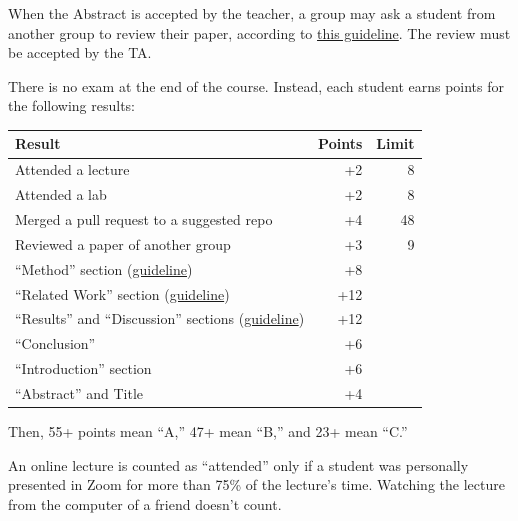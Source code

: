 \documentclass[nobrand,anonymous,nodate,nosecurity]{huawei}
\begin{document}
{When the Abstract is accepted by the teacher, a group may ask a student from another
group to review their paper, according to
\href{https://www.yegor256.com/2023/12/17/how-to-review-research-paper.html}{this guideline}.
The review must be accepted by the TA.

There is no exam at the end of the course. Instead,
each student earns points for the following results:\\
\renewcommand{\arraystretch}{1}
\begin{tabular}{lrr}
Result & Points & Limit \\
\hline
Attended a lecture & +2 & 8 \\
Attended a lab & +2 & 8 \\
Merged a pull request to a suggested repo & +4 & 48 \\
Reviewed a paper of another group & +3 & 9 \\
``Method'' section (\href{https://www.yegor256.com/2023/10/11/method-of-research.html}{guideline}) & +8 \\
``Related Work'' section (\href{https://www.yegor256.com/2023/09/29/how-to-write-related-work-section.html}{guideline}) & +12 \\
``Results'' and ``Discussion'' sections (\href{https://www.yegor256.com/2023/12/11/results-and-discussion.html}{guideline}) & +12 \\
``Conclusion'' & +6 \\
``Introduction'' section & +6 \\
``Abstract'' and Title & +4 \\
\end{tabular}

Then, 55+ points mean ``A,'' 47+ mean ``B,'' and 23+ mean ``C.''

An online lecture is counted as ``attended'' only if a student was personally
presented in Zoom for more than 75\% of the lecture's time. Watching the
lecture from the computer of a friend doesn't count.



}
\end{document}
